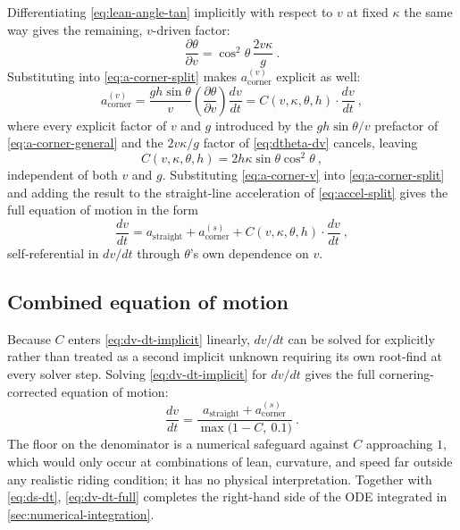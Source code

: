 Differentiating \cref{eq:lean-angle-tan} implicitly with respect to $v$ at
fixed $\kappa$ the same way gives the remaining, $v$-driven factor:
\begin{equation}
    \frac{\partial\theta}{\partial v} =
        \cos^2\theta\,\frac{2v\kappa}{g}\ .
    \label{eq:dtheta-dv}
\end{equation}
Substituting into \cref{eq:a-corner-split} makes $a_{\mathrm{corner}}^{(v)}$
explicit as well:
\begin{equation}
    a_{\mathrm{corner}}^{(v)} =
        \frac{gh\sin\theta}{v}\left(\frac{\partial\theta}{\partial v}\right)\frac{dv}{dt}
        = C(v,\kappa,\theta,h)\cdot\frac{dv}{dt}\ ,
    \label{eq:a-corner-v}
\end{equation}
where every explicit factor of $v$ and $g$ introduced by the
$gh\sin\theta/v$ prefactor of \cref{eq:a-corner-general} and the $2v\kappa/g$
factor of \cref{eq:dtheta-dv} cancels, leaving
\begin{equation}
    C(v,\kappa,\theta,h) =
        2 h \kappa \sin\theta \cos^2\theta\ ,
    \label{eq:feedback-coeff}
\end{equation}
independent of both $v$ and $g$. Substituting \cref{eq:a-corner-v} into
\cref{eq:a-corner-split} and adding the result to the straight-line
acceleration of \cref{eq:accel-split} gives the full equation of motion in the
form
\begin{equation}
    \frac{dv}{dt} = a_{\mathrm{straight}} + a_{\mathrm{corner}}^{(s)} +
        C(v,\kappa,\theta,h) \cdot \frac{dv}{dt}\ ,
    \label{eq:dv-dt-implicit}
\end{equation}
self-referential in $dv/dt$ through $\theta$'s own dependence on $v$.

\subsection{Combined equation of motion}
\label{sec:combined-eom}

Because $C$ enters \cref{eq:dv-dt-implicit} linearly, $dv/dt$ can be solved for
explicitly rather than treated as a second implicit unknown requiring its own
root-find at every solver step. Solving \cref{eq:dv-dt-implicit} for $dv/dt$
gives the full cornering-corrected equation of motion:
\begin{equation}
    \frac{dv}{dt} =
        \frac{a_{\mathrm{straight}} + a_{\mathrm{corner}}^{(s)}}
             {\max\bigl(1 - C,\ 0.1\bigr)}\ .
    \label{eq:dv-dt-full}
\end{equation}
The floor on the denominator is a numerical safeguard against $C$ approaching
$1$, which would only occur at combinations of lean, curvature, and speed far
outside any realistic riding condition; it has no physical interpretation. Together
with \cref{eq:ds-dt}, \cref{eq:dv-dt-full} completes the right-hand side of the
ODE integrated in \cref{sec:numerical-integration}.

